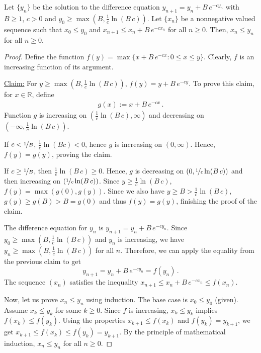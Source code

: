 \begin{lemma}
Let $\{y_n\}$ be the solution to the difference equation $y_{n+1} = y_n + B \, e^{-cy_n}$ with $B \geq 1$, $c > 0$ and $y_0 \ge \max(B,\frac{1}{c}\ln (B \, c))$. Let $\{x_n\}$ be a nonnegative valued sequence such that $x_0 \le y_0$ and $x_{n+1} \le x_n + B \, e^{-cx_n}$ for all $n \ge 0$. Then, $x_n \le y_n$ for all $n \ge 0$.
\label{lemma:difference-inequality}
\end{lemma}

\begin{proof}
Define the function $f(y) = \max \{ x + B \, e^{-cx} : 0\le x \le y \}$. Clearly, $f$ is an increasing function of its argument.

\noindent \underline{Claim:} For $y\ge \max(B, \frac{1}{c} \ln (B \, c))$, $f(y) = y + B \, e^{-cy}$.
To prove this claim, for $x\in \mathbb{R}$, define
\begin{align}\label{eq:gdef}
g(x) := x + B \, e^{-cx}\,.
\end{align}
Function $g$ is increasing on $(\frac{1}{c} \ln (B \, c), \infty)$ and decreasing on $(-\infty,\frac{1}{c}\ln (B \, c))$. 

If $c < \nicefrac{1}{B}$, $\frac{1}{c}\ln (Bc) < 0$, hence $g$ is increasing on $(0, \infty)$. Hence, $f(y)=g(y)$, proving the claim. 

If $c \ge \nicefrac{1}{B}$, then $\frac{1}{c}\ln (B \, c) \ge 0$. Hence, $g$ is decreasing on $(0, \nicefrac{1}{c}\ln (B \, c))$ and then increasing on $(\nicefrac{1}{c}\ln (B \, c) )$. Since $y\ge \frac{1}{c} \ln(B \, c)$, $f(y) = \max(g(0),g(y))$. Since we also have $y\ge B > \frac{1}{c}\ln (B \, c)$, $g(y) \ge g(B) > B = g(0)$ and thus $f(y)=g(y)$, finishing the proof of the claim.

The difference equation for $y_n$ is $y_{n+1} = y_n + B \, e^{-cy_n}$. Since $y_0 \ge \max(B,\frac{1}{c}\ln (B \,c))$ and $y_n$ is increasing, we have $y_n \ge \max(B,\frac{1}{c}\ln (B \,c))$ for all $n$. 
Therefore, we can apply the equality from the previous claim to get 
\[
y_{n+1} = y_n + B \, e^{-cy_n} = f(y_n)\,.
\]
The sequence $(x_n)$ satisfies the inequality $x_{n+1} \le x_n + B \, e^{-cx_n} \le f(x_n)$.

Now, let us prove $x_n \le y_n$ using induction. The base case is $x_0 \le y_0$ (given). Assume $x_k \le y_k$ for some $k \ge 0$. Since $f$ is increasing, $x_k \le y_k$ implies $f(x_k) \le f(y_k)$. Using the properties $x_{k+1} \le f(x_k)$ and $f(y_k) = y_{k+1}$, we get $x_{k+1} \le f(x_k) \le f(y_k) = y_{k+1}$. By the principle of mathematical induction, $x_n \le y_n$ for all $n \ge 0$.
\end{proof}

